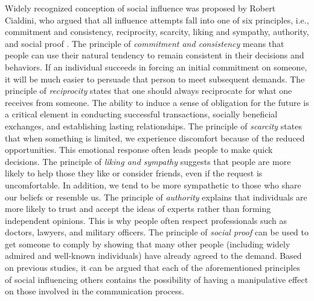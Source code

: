 Widely recognized conception of social influence was proposed by Robert Cialdini, who argued that all influence attempts fall into one of six principles, i.e., commitment and consistency, reciprocity, scarcity, liking and sympathy, authority, and social proof \cite{cialdini2021influence}.  
The principle of \textit{commitment and consistency} means that people can use their natural tendency to remain consistent in their decisions and behaviors.  If an individual succeeds in forcing an initial commitment on someone, it will be much easier to persuade that person to meet subsequent demands. The principle of \textit{reciprocity} states that one should always reciprocate for what one receives from someone. The ability to induce a sense of obligation for the future is a critical element in conducting successful transactions, socially beneficial exchanges, and establishing lasting relationships. The principle of \textit{scarcity }states that when something is limited, we experience discomfort because of the reduced opportunities. This emotional response often leads people to make quick decisions. The principle of \textit{liking and sympathy} suggests that people are more likely to help those they like or consider friends, even if the request is uncomfortable. In addition, we tend to be more sympathetic to those who share our beliefs or resemble us. The principle of \textit{authority} explains that individuals are more likely to trust and accept the ideas of experts rather than forming independent opinions. This is why people often respect professionals such as doctors, lawyers, and military officers. The principle of \textit{social proof }can be used to get someone to comply by showing that many other people (including widely admired and well-known individuals) have already agreed to the demand.
Based on previous studies, it can be argued that each of the aforementioned principles of social influencing others contains the possibility of having a manipulative effect on those involved in the communication process.